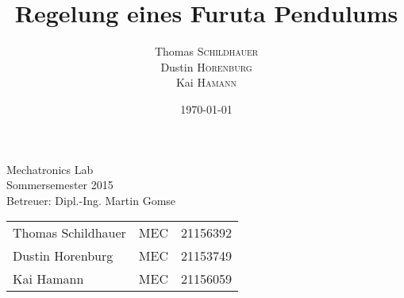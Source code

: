 \title{Regelung eines Furuta Pendulums} %

\author{
Thomas \textsc{Schildhauer} \\
Dustin \textsc{Horenburg} \\
Kai \textsc{Hamann} } %


\date{\today} %



\maketitle %

\vspace{2cm}

\begin{center}
Mechatronics Lab \\
Sommersemester 2015 \\ 
Betreuer: Dipl.-Ing. Martin Gomse

\vspace{2cm}

\begin{tabular}{l c r}
Thomas Schildhauer	& MEC & 21156392 \\
Dustin Horenburg	& MEC & 21153749 \\
Kai Hamann			& MEC & 21156059

\end{tabular}
\end{center}

